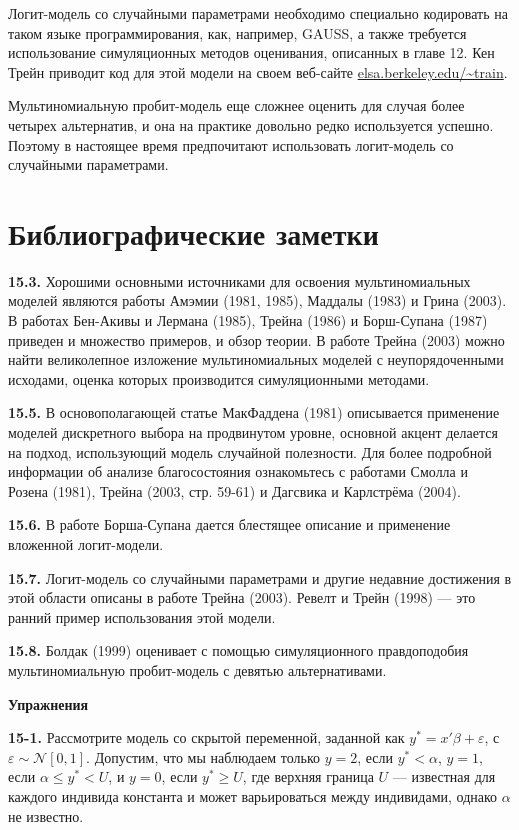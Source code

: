 Логит-модель со случайными параметрами необходимо специально кодировать на таком языке программирования, как, например, GAUSS, а также требуется использование симуляционных методов оценивания, описанных в главе 12. Кен Трейн приводит код для этой модели на своем веб-сайте \url{elsa.berkeley.edu/~train}.

Мультиномиальную пробит-модель еще сложнее оценить для случая более четырех альтернатив, и она на практике довольно редко используется успешно. Поэтому в настоящее время предпочитают использовать логит-модель со случайными параметрами.

\section{Библиографические заметки}

\textbf{15.3.} Хорошими основными источниками для освоения мультиномиальных моделей являются работы Амэмии (1981, 1985), Маддалы (1983) и Грина (2003). В работах Бен-Акивы и Лермана (1985), Трейна (1986) и Борш-Супана (1987) приведен и множество примеров, и обзор теории. В работе Трейна (2003) можно найти великолепное изложение мультиномиальных моделей с неупорядоченными исходами, оценка которых производится симуляционными методами.

\textbf{15.5.} В основополагающей статье МакФаддена (1981) описывается применение моделей дискретного выбора на продвинутом уровне, основной акцент делается на подход, использующий модель случайной полезности. Для более подробной информации об анализе благосостояния ознакомьтесь с работами Смолла и Розена (1981), Трейна (2003, стр. 59-61) и Дагсвика и Карлстрёма (2004).

\textbf{15.6.} В работе Борша-Супана дается блестящее описание и применение вложенной логит-модели.

\textbf{15.7.} Логит-модель со случайными параметрами и другие недавние достижения в этой области описаны в работе Трейна (2003). Ревелт и Трейн (1998) --- это ранний пример использования этой модели.

\textbf{15.8.} Болдак (1999) оценивает с помощью симуляционного правдоподобия мультиномиальную пробит-модель с девятью альтернативами.

\textbf{Упражнения}

\textbf{15-1. } Рассмотрите модель со скрытой переменной, заданной как $y^*=x'\beta +\varepsilon $, с $\varepsilon \sim {\mathcal N}[0, 1]$. Допустим, что мы наблюдаем только $y=2$, если $y^*<\alpha $, $y=1$, если $\alpha \le y^*<U$, и $y=0$, если $y^*\ge U$, где верхняя граница $U$ --- известная для каждого индивида константа и может варьироваться между индивидами, однако $\alpha $ не известно.

